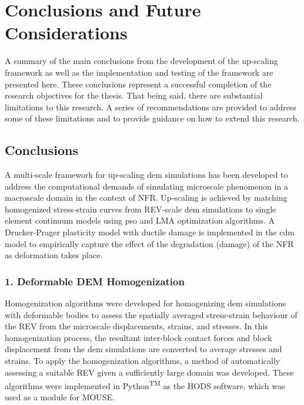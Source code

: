 \chapter{Conclusions and Future Considerations}

A summary of the main conclusions from the development of the up-scaling framework as well as the implementation and testing of the framework are presented here. These conclusions represent a successful completion of the research objectives for the thesis. That being said, there are substantial limitations to this research. A series of recommendations are provided to address some of these limitations and to provide guidance on how to extend this research.

\section{Conclusions}
A multi-scale framework for up-scaling \acrshort{dem} simulations has been developed to address the computational demands of simulating microscale phenomenon in a macroscale domain in the context of NFR. Up-scaling is achieved by matching homogenized stress-strain curves from REV-scale \acrshort{dem} simulations to single element continuum models using \acrshort{pso} and LMA optimization algorithms. A Drucker-Prager plasticity model with ductile damage is implemented in the \acrshort{cdm} model to empirically capture the effect of the degradation (damage) of the NFR as deformation takes place.

\subsection*{1. Deformable DEM Homogenization}

Homogenization algorithms were developed for homogenizing \acrshort{dem} simulations with deformable bodies to assess the spatially averaged stress-strain behaviour of the REV from the microscale displacements, strains, and stresses. In this homogenization process, the resultant inter-block contact forces and block displacement from the \acrshort{dem} simulations are converted to average stresses and strains. To apply the homogenization algorithms, a method of automatically assessing a suitable REV given a sufficiently large domain was developed. These algorithms were implemented in Python\textsuperscript{TM} as the HODS software, which was used as a module for MOUSE.


